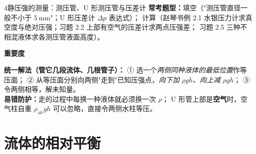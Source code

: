 \begin{kaodian}{4}{静压强的测量：测压管、U 形测压管与压差计}
\textbf{常考题型：}填空（"测压管直径一般不小于 $5\ \mathrm{mm}$"；U 形压差计 $\Delta p$ 表达式）；
计算（赵琴书例 2.1 水银压力计求真空度与绝对压强；习题 2.2 上部有空气的压差计求两点压强差；
习题 2.5 三种不相混液体求各测压管液面高度）。

\textbf{重要度 }\quad{}\quad{}

\begin{banfa}
\textbf{统一解法（管它几段流体、几根管子）：}
① 选一个\emph{两侧同种液体的最低位置}作等压面；
② 从等压面分别向两侧"走到"已知压强点，\emph{向下加 $\rho g h$、向上减 $\rho g h$}；
③ 令两侧相等，解未知量。\\
\textbf{易错防护：}走的过程中每换一种液体就必须换一次 $\rho$；
U 形管上部是\textbf{空气}时，空气柱自重 $\rho_{\text{air}}gh$ 可以忽略，直接令两侧水柱等压。
\end{banfa}
\end{kaodian}

\section{流体的相对平衡}

